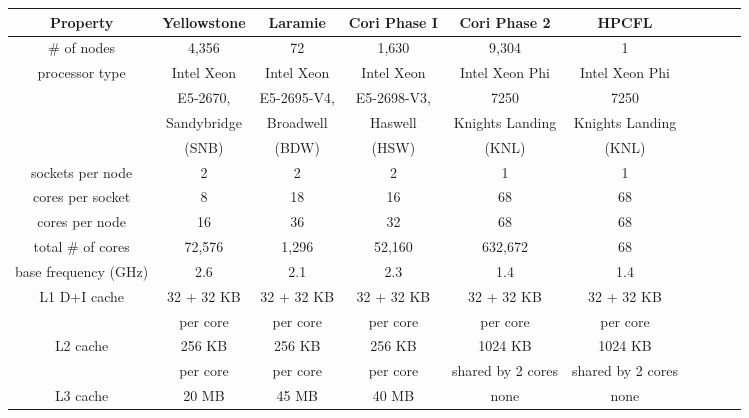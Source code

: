 \begin{table}
\begin{center}
\begin{tabular}{|c|c|c|c|c|c|c|c|c|c|}
\hline
Property                   & Yellowstone & Laramie    & Cori Phase I & Cori Phase 2     & HPCFL           \\ \hline
\# of nodes            &     4,356   &      72    &    1,630     &       9,304       &  1             \\ \hline
processor type             & Intel Xeon  & Intel Xeon & Intel Xeon   & Intel Xeon Phi   & Intel Xeon Phi  \\
			   & E5-2670,    & E5-2695-V4,& E5-2698-V3,  &  7250            & 7250            \\
                           & Sandybridge & Broadwell  & Haswell      & Knights Landing  & Knights Landing \\
                           & (SNB)       & (BDW)      & (HSW)        & (KNL)            & (KNL)           \\ \hline
sockets per node           & 2           &  2         &  2           &  1               & 1               \\ \hline
cores per socket           &  8          &   18       &  16          &    68            & 68             \\ \hline
cores per node             & 16          &   36       &  32          &    68            & 68             \\ \hline
total \# of cores          & 72,576      & 1,296      & 52,160       &  632,672         & 68             \\ \hline
base frequency (GHz)       & 2.6         & 2.1        & 2.3          &  1.4             & 1.4             \\ \hline
L1 D+I cache               & 32 + 32 KB  & 32 + 32 KB & 32 + 32 KB   &  32 + 32 KB      & 32 + 32 KB     \\
                           & per core    & per core   & per core     & per core         & per core    \\ \hline
L2 cache                   & 256 KB      & 256 KB     & 256 KB       &  1024 KB         & 1024 KB \\
                           & per core    & per core   & per core     & shared by 2 cores & shared by 2 cores \\ \hline
L3 cache                   & 20 MB       & 45 MB      & 40 MB        &  none            & none           \\

\end{tabular}
\end{center}
\end{table}
